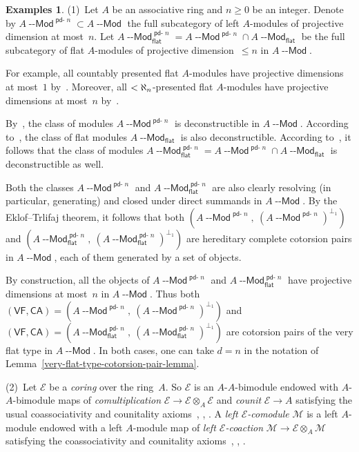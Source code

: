 \documentclass[12pt,a4paper]{amsart}
\newcommand{\+}{\nobreakdash-}
\renewcommand{\:}{\colon}
\newcommand{\rarrow}{\longrightarrow}
\newcommand{\ot}{\otimes}
\newcommand{\Modl}{{\operatorname{\mathsf{--Mod}}}}
\newcommand{\cE}{\mathcal E}
\newcommand{\cM}{\mathcal M}
\newcommand{\VF}{\mathsf{VF}}
\newcommand{\CA}{\mathsf{CA}}
\renewcommand{\flat}{\mathsf{flat}}
\newcommand{\pdn}{{{\operatorname{\mathsf{pd-}}}n}}
\theoremstyle{plain}
\theoremstyle{definition}
\newtheorem{exs}[thm]{Examples}
\begin{document}
\begin{exs} \label{flat-projdim1-modules-and-comodules-exs}
 (1)~Let $A$ be an associative ring and $n\ge0$ be an integer.
 Denote by $A\Modl^\pdn\subset A\Modl$ the full subcategory of left
$A$\+modules of projective dimension at most~$n$.
 Let $A\Modl^\pdn_\flat=A\Modl^\pdn\cap A\Modl_\flat$ be the full
subcategory of flat $A$\+modules of projective dimension~$\le n$
in $A\Modl$.

 For example, all countably presented flat $A$\+modules have projective
dimensions at most~$1$ by~\cite[Corollary~2.23]{GT}.
 Moreover, all $<\nobreak\aleph_n$\+presented flat $A$\+modules have
projective dimensions at most~$n$ by~\cite[Proposition~5.3]{Jen}.

 By~\cite[Lemmas~6.4 and~8.9]{GT}, the class of modules $A\Modl^\pdn$
is deconstructible in $A\Modl$.
 According to~\cite[Section~2]{BBE}, the class of flat modules
$A\Modl_\flat$ is also deconstructible.
 According to~\cite[Proposition~2.9(2)]{Sto-hill}, it follows that
the class of modules $A\Modl^\pdn_\flat=A\Modl^\pdn\cap A\Modl_\flat$
is deconstructible as well.

 Both the classes $A\Modl^\pdn$ and $A\Modl^\pdn_\flat$ are also
clearly resolving (in particular, generating) and closed under
direct summands in $A\Modl$.
 By the Eklof--Trlifaj theorem, it follows that both $(A\Modl^\pdn,
\allowbreak\>(A\Modl^\pdn)^{\perp_1})$ and $(A\Modl^\pdn_\flat,
\allowbreak\>(A\Modl^\pdn_\flat)^{\perp_1})$ are hereditary complete
cotorsion pairs in $A\Modl$, each of them generated by a set of objects.

 By construction, all the objects of $A\Modl^\pdn$ and
$A\Modl^\pdn_\flat$ have projective dimensions at most~$n$ in $A\Modl$.
 Thus both $(\VF,\CA)=(A\Modl^\pdn,\allowbreak\>
(A\Modl^\pdn)^{\perp_1})$ and $(\VF,\CA)=(A\Modl^\pdn_\flat,
\allowbreak\>(A\Modl^\pdn_\flat)^{\perp_1})$ are
cotorsion pairs of the very flat type in $A\Modl$.
 In both cases, one can take $d=n$ in the notation of
Lemma~\ref{very-flat-type-cotorsion-pair-lemma}.

\smallskip
 (2)~Let $\cE$ be a \emph{coring} over the ring~$A$.
 So $\cE$ is an $A$\+$A$\+bimodule endowed with $A$\+$A$\+bimodule
maps of \emph{comultiplication} $\cE\rarrow\cE\ot_A\cE$ and
\emph{counit} $\cE\rarrow A$ satisfying the usual coassociativity and
counitality axioms~\cite[Section~17.1]{BW}, \cite[Section~1.1]{Psemi},
\cite[Section~2]{Pflcc}.
 A \emph{left\/ $\cE$\+comodule} $\cM$ is a left $A$\+module endowed
with a left $A$\+module map of \emph{left\/ $\cE$\+coaction}
$\cM\rarrow\cE\ot_A\cM$ satisfying the coassociativity and counitality
axioms~\cite[Sections~18.1\+-3]{BW}, \cite[Section~1.1]{Psemi},
\cite[Section~2]{Pflcc}.


\end{exs}
\end{document}
